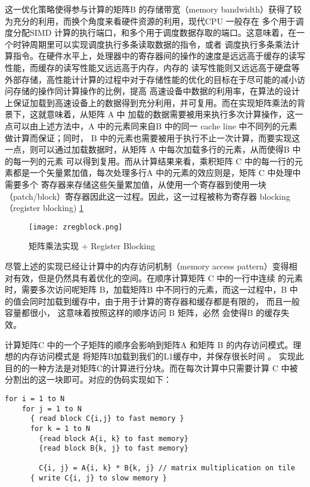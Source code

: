 这一优化策略使得参与计算的矩阵B 的存储带宽（memory bandwidth）获得了较为充分的利用，而换个角度来看硬件资源的利用，现代CPU 一般存在
多个用于调度分配SIMD 计算的执行端口，和多个用于调度数据存取的端口。这意味着，在一个时钟周期里可以实现调度执行多条读取数据的指令，或者
调度执行多条乘法计算指令。在硬件水平上，处理器中的寄存器间的操作的速度是远远高于缓存的读写性能，而缓存的读写性能又远远高于内存，内存的
读写性能则又远远高于硬盘等外部存储，高性能计计算的过程中对于存储性能的优化的目标在于尽可能的减小访问存储的操作同计算操作的比例，提高
高速设备中数据的利用率，在算法的设计上保证加载到高速设备上的数据得到充分利用，并可复用。而在实现矩阵乘法的背景下，这就意味着，从矩阵 A 中
加载的数据需要被用来执行多次计算操作，这一点可以由上述方法中，A 中的元素同来自B 中的同一 cache line 中不同列的元素做计算而保证；同时，
B 中的元素也需要被用于执行不止一次计算，而要实现这一点，则可以通过加载数据时，从矩阵 A 中每次加载多行的元素，从而使得B 中的每一列的元素
可以得到复用。而从计算结果来看，乘积矩阵 C 中的每一行的元素都是一个矢量累加值，每次处理多行A 中的元素的效应则是，矩阵 C 中处理中需要多个
寄存器来存储这些矢量累加值，从使用一个寄存器到使用一块（patch/block）寄存器因此这一过程。因此，这一过程被称为寄存器 blocking （register blocking) \ref{fig:zregblock}

\begin{figure}
\centering
\texttt{[image: zregblock.png]}
\caption{矩阵乘法实现 + Register Blocking}
\label{fig:zregblock}
\end{figure}

尽管上述的实现已经让计算中的内存访问机制（memory access pattern）变得相对有效，但是仍然具有着优化的空间。在顺序计算矩阵 C 中的一行中连续
的元素时，需要多次访问呢矩阵 B，加载矩阵B 中不同行的元素，而这一过程中，B 中的值会同时加载到缓存中，由于用于计算的寄存器和缓存都是有限的，
而且一般容量都很小， 这意味着按照这样的顺序访问 B 矩阵，必然 会使得B 的缓存失效。

计算矩阵C 中的一个子矩阵的顺序会影响到矩阵A 和矩阵 B 的内存访问模式。理想的内存访问模式是 将矩阵B加载到我们的L1缓存中，并保存很长时间 。
实现此目的的一种方法是对矩阵C的计算进行分块。而在每次计算中只需要计算 C 中被分割出的这一块即可。对应的伪码实现如下：

\begin{lstlisting}[label={code:tiled_matmul}, caption={Cache Blocking 矩阵乘法}]
  for i = 1 to N
    for j = 1 to N
      { read block C{i,j} to fast memory }
      for k = 1 to N
        {read block A{i, k} to fast memory}
        {read block B{k, j} to fast memory}
        
        C{i, j} = A{i, k} * B{k, j} // matrix multiplication on tile
      { write C{i, j} to slow memory }
\end{lstlisting}

